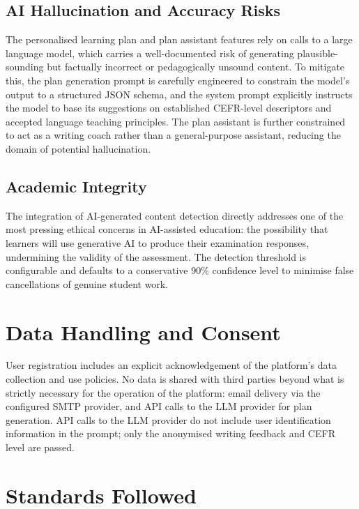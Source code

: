 \documentclass[12pt, a4paper]{report}
\begin{document}
\subsection{AI Hallucination and Accuracy Risks}

The personalised learning plan and plan assistant features rely on calls to a large language model, which carries a well-documented risk of generating plausible-sounding but factually incorrect or pedagogically unsound content. To mitigate this, the plan generation prompt is carefully engineered to constrain the model's output to a structured JSON schema, and the system prompt explicitly instructs the model to base its suggestions on established CEFR-level descriptors and accepted language teaching principles. The plan assistant is further constrained to act as a writing coach rather than a general-purpose assistant, reducing the domain of potential hallucination.

\subsection{Academic Integrity}

The integration of AI-generated content detection directly addresses one of the most pressing ethical concerns in AI-assisted education: the possibility that learners will use generative AI to produce their examination responses, undermining the validity of the assessment. The detection threshold is configurable and defaults to a conservative 90\% confidence level to minimise false cancellations of genuine student work.

\section{Data Handling and Consent}

User registration includes an explicit acknowledgement of the platform's data collection and use policies. No data is shared with third parties beyond what is strictly necessary for the operation of the platform: email delivery via the configured SMTP provider, and API calls to the LLM provider for plan generation. API calls to the LLM provider do not include user identification information in the prompt; only the anonymised writing feedback and CEFR level are passed.

\section{Standards Followed}
\end{document}
